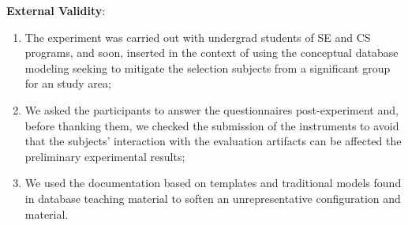 \textbf{External Validity}: 
\begin{enumerate}[label=\roman*.]
    \item The experiment was carried out with undergrad students of SE and CS programs, and soon, inserted in the context of using the conceptual database modeling seeking to mitigate the selection subjects from a significant group for an study area; 
    \item We asked the participants to answer the questionnaires post-experiment and, before thanking them, we checked the submission of the instruments to avoid that the subjects' interaction with the evaluation artifacts can be affected the preliminary experimental results; 
    \item We used the documentation based on templates and traditional models found in database teaching material to soften an unrepresentative configuration and material.
\end{enumerate}

